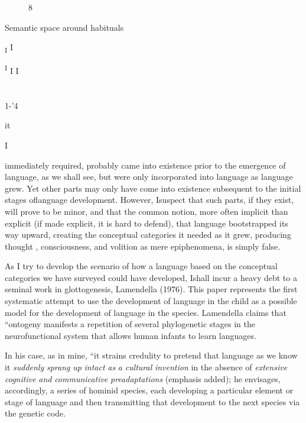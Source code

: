 \begin{figure}
\caption{8}
\label{fig:4}
\end{figure}

Semantic space around habituals


\textsubscript{I} I

\textsuperscript{I }I I 

\section{}
1-'4

it

I


immediately required, probably came into existence prior to the emergence of language, as we shall see, but were only incorporated into language as language grew. Yet other parts may only have come into existence subsequent to the initial stages oflanguage development. However, Isuspect that such parts, if they exist, will prove to be minor, and that the common notion, more often implicit than explicit (if made explicit, it is hard to defend), that language bootstrapped its way upward, creating the conceptual categories it needed as it grew, pro\-ducing thought , consciousness, and volition as mere epiphenomena, is simply false.

As I try to develop the scenario of how a language based on the conceptual categories we have surveyed could have developed, Ishall incur a heavy debt to a seminal work in glottogenesis, Lamen\-della (1976). This paper represents the first systematic attempt to use the development of language in the child as a possible model for the development of language in the species. Lamendella claims that ``on\-togeny manifests a repetition of several phylogenetic stages in the neurofunctional system that allows human infants to learn languages.{\textquotedbl}

In his
case,
as in mine, ``it strains credulity to pretend that language
as we know it \textit{suddenly} \textit{sprang} \textit{up} \textit{intact} \textit{as} \textit{a} \textit{cultural} \textit{invention} in the absence of \textit{extensive} \textit{cognitive} \textit{and} \textit{communicative} \textit{preadaptations{\textquotedbl}} (emphasis added); he envisages, accordingly, a series of hominid species, each developing a particular element or stage of language and then transmitting that development to the next species via the genetic code. 

